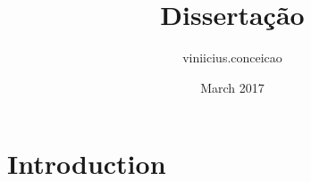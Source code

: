 \documentclass{article}
\title{Dissertação}
\author{viniicius.conceicao }
\date{March 2017}
\begin{document}
\maketitle

\section{Introduction}
\end{document}
